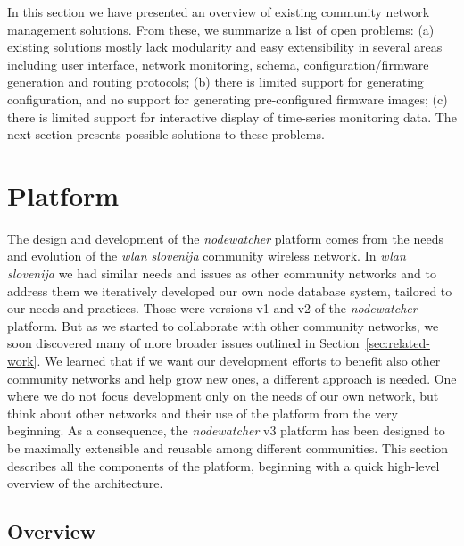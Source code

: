 \documentclass[5p,sort&compress]{elsarticle}
\newcommand{\nodewatcher}{\textit{nodewatcher}}
\newcommand{\wlanslovenija}{\textit{wlan slovenija}}
\begin{document}
In this section we have presented an overview of existing community network management solutions.
From these, we summarize a list of open problems:
(a) existing solutions mostly lack modularity and easy extensibility in several areas including user interface, network monitoring, schema, configuration/firmware generation and routing protocols;
(b) there is limited support for generating configuration, and no support for generating pre-configured firmware images;
(c) there is limited support for interactive display of time-series monitoring data.
The next section presents possible solutions to these problems.

\section{Platform}
\label{sec:platform}

The design and development of the \nodewatcher{} platform comes from the needs and evolution of the \wlanslovenija{} community wireless network.
In \wlanslovenija{} we had similar needs and issues as other community networks and to address them we iteratively developed our own node database system, tailored to our needs and practices.
Those were versions v1 and v2 of the \nodewatcher{} platform.
But as we started to collaborate with other community networks, we soon discovered many of more broader issues outlined in Section~\ref{sec:related-work}.
We learned that if we want our development efforts to benefit also other community networks and help grow new ones, a different approach is needed.
One where we do not focus development only on the needs of our own network, but think about other networks and their use of the platform from the very beginning.
As a consequence, the \nodewatcher{} v3 platform has been designed to be maximally extensible and reusable among different communities.
This section describes all the components of the platform, beginning with a quick high-level overview of the architecture.

\subsection{Overview}
\end{document}
